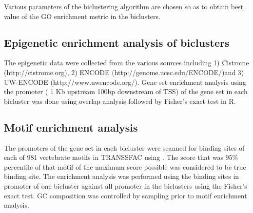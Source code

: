 \documentclass{article}
\begin{document}
Various parameters of the biclustering algorithm are chosen so as to obtain 
best value of the GO enrichment metric in the biclusters. 

\subsection{Epigenetic enrichment analysis of biclusters}
The epigenetic data were collected from the various sources including 1) Cistrome (http://cistrome.org), 2) ENCODE (http://genome.ucsc.edu/ENCODE/)and 3) UW-ENCODE (http://www.uwencode.org/).  Gene set enrichment analysis using the 
promoter ( 1 Kb upstream 100bp downstream of TSS)
of the gene set in each bicluster was done using overlap analysis followed by Fisher's exact test in R.

\subsection{Motif enrichment analysis}
The promoters of the gene set in each bicluster were scanned 
for binding sites of each of  981 vertebrate motifs in TRANSSFAC using \cite{hannenhalli2008eukaryotic}.
The score
that was 95\% percentile of that motif of the maximum score possible was considered to be true binding site. The
enrichment analysis was performed using the binding sites in promoter of one bicluster against all promoter in 
the biclusters using the Fisher's exact test. GC composition was controlled by sampling prior to motif enrichment 
analysis. 
\end{document}

